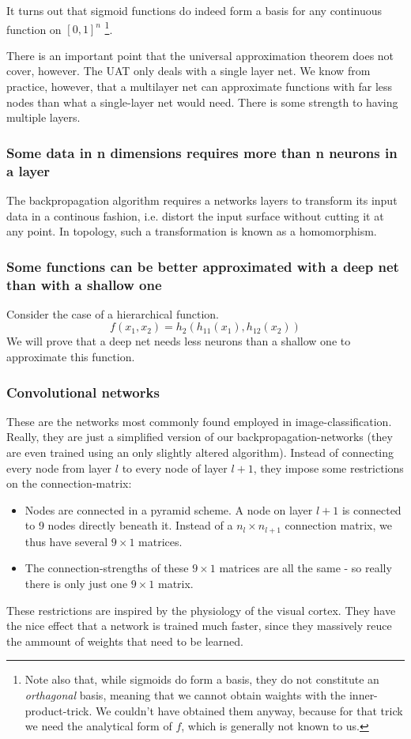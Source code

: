It turns out that sigmoid functions do indeed form a basis for any continuous function on $[0,1]^n$ \footnote{Note also that, while sigmoids do form a basis, they do not constitute an \emph{orthagonal} basis, meaning that we cannot obtain waights with the inner-product-trick. We couldn't have obtained them anyway, because for that trick we need the analytical form of $f$, which is generally not known to us.}.

There is an important point that the universal approximation theorem does not cover, however. The UAT only deals with a single layer net. We know from practice, however, that a multilayer net can approximate functions with far less nodes than what a single-layer net would need. There is some strength to having multiple layers.



\subsubsection{Some data in n dimensions requires more than n neurons in a layer}
The backpropagation algorithm requires a networks layers to transform its input data in a continous fashion, i.e. distort the input surface without cutting it at any point. In topology, such a transformation is known as a homomorphism.  

\subsubsection{Some functions can be better approximated with a deep net than with a shallow one}
Consider the case of a hierarchical function. 
$$ f(x_1, x_2) = h_2( h_11(x_1), h_12(x_2))$$
We will prove that a deep net needs less neurons than a shallow one to approximate this function.





\subsubsection{Convolutional networks}

These are the networks most commonly found employed in image-classification. Really, they are just a simplified version of our backpropagation-networks (they are even trained using an only slightly altered algorithm). Instead of connecting every node from layer $l$ to every node of layer $l+1$, they impose some restrictions on the connection-matrix:
\begin{itemize}
	\item Nodes are connected in a pyramid scheme. A node on layer $l+1$ is connected to 9 nodes directly beneath it. Instead of a $n_l \times n_{l+1}$ connection matrix, we thus have several $9 \times 1$ matrices.
	\item The connection-strengths of these  $9 \times 1$ matrices are all the same - so really there is only just one  $9 \times 1$ matrix. 
\end{itemize}
These restrictions are inspired by the physiology of the visual cortex. They have the nice effect that a network is trained much faster, since they massively reuce the ammount of weights that need to be learned. 

